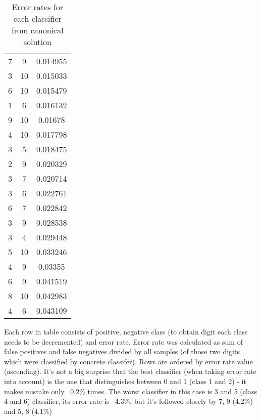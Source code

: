 \documentclass[a4paper, 11pt, wide]{article}
\begin{document}
\begin{table}[H]
\begin{center}
{\begin{tabular}{ |c|c|c| }
    7 & 9 & 0.014955 \\
    3 & 10 & 0.015033 \\
    6 & 10 & 0.015479 \\
    1 & 6 & 0.016132 \\
    9 & 10 & 0.01678 \\
    4 & 10 & 0.017798 \\
    3 & 5 & 0.018475 \\
    2 & 9 & 0.020329 \\
    3 & 7 & 0.020714 \\
    3 & 6 & 0.022761 \\
    6 & 7 & 0.022842 \\
    3 & 9 & 0.028538 \\
    3 & 4 & 0.029448 \\
    5 & 10 & 0.033246 \\
    4 & 9 & 0.03355 \\
    6 & 9 & 0.041519 \\
    8 & 10 & 0.042983 \\
    4 & 6 & 0.043109 \\
 \hline
\end{tabular}
}
\end{center}
\caption{Error rates for each classifier from canonical solution}
\end{table}
Each row in table consists of positive, negative class (to obtain digit 
each class needs to be decremented) and error rate. Error rate was calculated as
sum of false positives and false negatives divided by all samples (of those two 
digits which were classified by concrete classifer).
Rows are ordered by error rate value (ascending).
It's not a big surprise that the best classifier (when taking error rate into account) 
is the one that distinguishes between 0 and 1 (class 1 and 2) - it makes mistake only ~0.2\% times.
The worst classifier in this case is 3 and 5 (class 4 and 6) classifier, its error
rate is ~4.3\%, but it's followed closely by 7, 9 (4.2\%) and 5, 8 (4.1\%)
\end{document}
